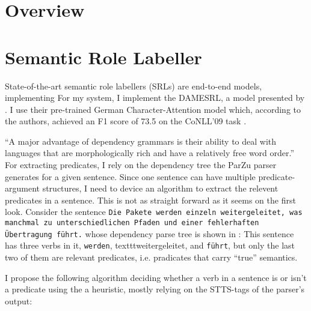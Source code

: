
\label{chap:4_architecture}

\section{Overview}

\section{Semantic Role Labeller}

State-of-the-art semantic role labellers (SRLs) are end-to-end models, implementing 
For my system, I implement the DAMESRL, a model presented by \cite{do2018flexible}.
I use their pre-trained German Character-Attention model which, according to the authors, achieved an F1 score of 73.5 on the CoNLL'09 task \citep{hajivc2009conll}.

``A major advantage of dependency grammars is their ability to deal with languages that are morphologically rich and have a relatively free word order.'' \citep[p.~274]{jurafsky2019speech}
For extracting predicates, I rely on the dependency tree the ParZu parser \cite{sennrich2013exploiting} generates for a given sentence.
Since one sentence can have multiple predicate-argument structures, I need to device an algorithm to extract the relevent predicates in a sentence.
This is not as straight forward as it seems on the first look.
Consider the sentence \texttt{Die Pakete werden einzeln weitergeleitet, was manchmal zu unterschiedlichen Pfaden und einer fehlerhaften Übertragung führt.} whose dependency parse tree is shown in :
This sentence has three verbs in it, \texttt{werden}, texttt{weitergeleitet}, and \texttt{führt}, but only the last two of them are relevant predicates, i.e. pradicates that carry ``true'' semantics.

{\centering {}}

I propose the following algorithm deciding whether a verb in a sentence is or isn't a predicate using the a heuristic, mostly relying on the STTS-tags \citep{schiller1999guidelines} of the parser's output:

